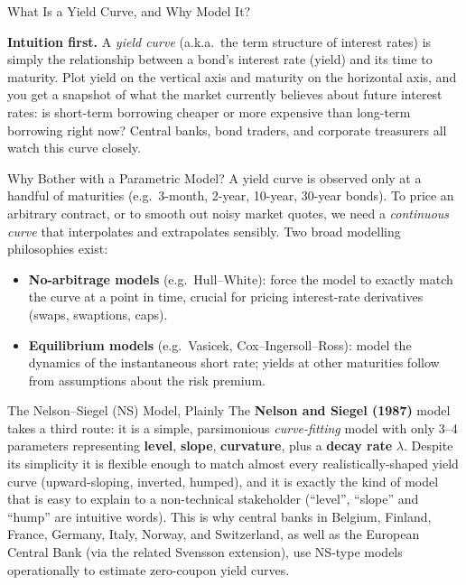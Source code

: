 \documentclass[aspectratio=169,10pt]{beamer}
\begin{document}
\begin{frame}[allowframebreaks]{What Is a Yield Curve, and Why Model It?}

\textbf{Intuition first.} A \emph{yield curve} (a.k.a.\ the term structure of
interest rates) is simply the relationship between a bond's interest rate
(yield) and its time to maturity. Plot yield on the vertical axis and
maturity on the horizontal axis, and you get a snapshot of what the market
currently believes about future interest rates: is short-term borrowing
cheaper or more expensive than long-term borrowing right now? Central banks,
bond traders, and corporate treasurers all watch this curve closely.

\begin{block}{Why Bother with a Parametric Model?}
  A yield curve is observed only at a handful of maturities (e.g.\ 3-month,
  2-year, 10-year, 30-year bonds). To price an arbitrary contract, or to
  smooth out noisy market quotes, we need a \emph{continuous curve} that
  interpolates and extrapolates sensibly. Two broad modelling philosophies
  exist:
  \begin{itemize}
    \item \textbf{No-arbitrage models} (e.g.\ Hull--White): force the model
      to exactly match the curve at a point in time, crucial for pricing
      interest-rate derivatives (swaps, swaptions, caps).
    \item \textbf{Equilibrium models} (e.g.\ Vasicek, Cox--Ingersoll--Ross):
      model the dynamics of the instantaneous short rate; yields at other
      maturities follow from assumptions about the risk premium.
  \end{itemize}
\end{block}

\framebreak

\begin{exampleblock}{The Nelson--Siegel (NS) Model, Plainly}
  The \textbf{Nelson and Siegel (1987)} model takes a third route: it is a
  simple, parsimonious \emph{curve-fitting} model with only 3--4 parameters
  representing \textbf{level}, \textbf{slope}, \textbf{curvature}, plus a
  \textbf{decay rate} $\lambda$. Despite its simplicity it is flexible enough
  to match almost every realistically-shaped yield curve (upward-sloping,
  inverted, humped), and it is exactly the kind of model that is easy to
  explain to a non-technical stakeholder (``level'', ``slope'' and ``hump''
  are intuitive words). This is why central banks in Belgium, Finland,
  France, Germany, Italy, Norway, and Switzerland, as well as the European
  Central Bank (via the related Svensson extension), use NS-type models
  operationally to estimate zero-coupon yield curves.
\end{exampleblock}


\end{frame}
\end{document}
